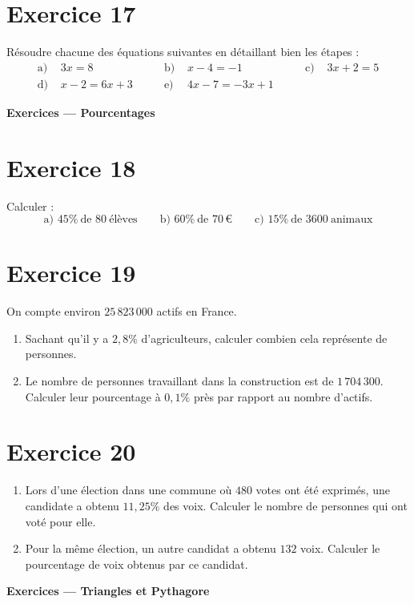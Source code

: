 \documentclass[a4paper,11pt]{article}
\begin{document}
\section*{Exercice 17}
Résoudre chacune des équations suivantes en détaillant bien les étapes :
\[
\begin{aligned}
\text{a) }& 3x=8 
&\qquad \text{b) }& x-4=-1
&\qquad \text{c) }& 3x+2=5\\[6pt]
\text{d) }& x-2=6x+3 
&\qquad \text{e) }& 4x-7=-3x+1
\end{aligned}
\]

\bigskip
{\Large \textbf{Exercices — Pourcentages}}\par\medskip


\section*{Exercice 18}
Calculer :
\[
\text{a) }45\%\ \text{de } 80\ \text{élèves}
\qquad
\text{b) }60\%\ \text{de }70\,€
\qquad
\text{c) }15\%\ \text{de }3600\ \text{animaux}
\]


\section*{Exercice 19}
On compte environ \(25\,823\,000\) actifs en France.
\begin{enumerate}
  \item Sachant qu’il y a \(2,8\%\) d’agriculteurs, calculer combien cela représente de personnes.
  \item Le nombre de personnes travaillant dans la construction est de \(1\,704\,300\).  
  Calculer leur pourcentage à \(0,1\%\) près par rapport au nombre d’actifs.
\end{enumerate}


\section*{Exercice 20}
\begin{enumerate}
  \item Lors d’une élection dans une commune où \(480\) votes ont été exprimés, une candidate a obtenu \(11,25\%\) des voix. Calculer le nombre de personnes qui ont voté pour elle.
  \item Pour la même élection, un autre candidat a obtenu \(132\) voix. Calculer le pourcentage de voix obtenus par ce candidat.
\end{enumerate}

\bigskip
{\Large \textbf{Exercices — Triangles et Pythagore}}\par\medskip
\end{document}
